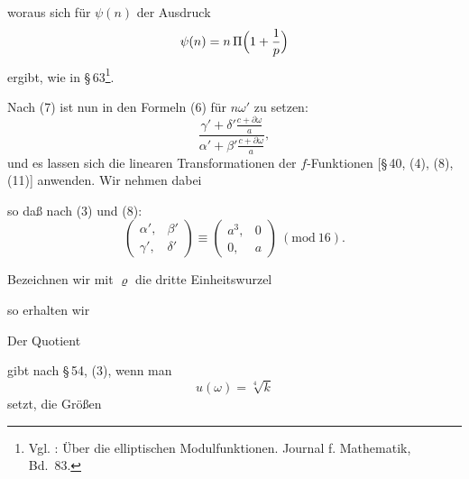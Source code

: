 woraus sich für $\psi(n)$ der Ausdruck
\[
\psi(n) = n\,\Pi\Bigl(1+\frac{1}{p}\Bigr)
\]
ergibt, wie in §\,63\footnote{Vgl. : Über die
elliptischen Modulfunktionen. Journal f. Mathematik, Bd.\ 83.}.

Nach (7) ist nun in den Formeln (6) für $n\omega'$ zu setzen:
\[
\frac{\displaystyle \gamma' + \delta'\frac{c+\partial\omega}{a}}{\displaystyle \alpha' + \beta'\frac{c+\partial\omega}{a}},
\]
und es lassen sich die linearen Transformationen der $f$-Funktionen
[§\,40, (4), (8), (11)] anwenden. Wir nehmen dabei


so daß nach (3) und (8):
\[
\begin{pmatrix} \alpha', & \beta' \\ \gamma', & \delta' \end{pmatrix} \equiv \begin{pmatrix} a^3, & 0 \\ 0, & a \end{pmatrix}\ (\mathrm{mod}\ 16).
\]

Bezeichnen wir mit $\varrho$ die dritte Einheitswurzel


so erhalten wir

Der Quotient


gibt nach §\,54, (3), wenn man
\[
u(\omega) = \sqrt[4]{k}
\]
setzt, die Größen
